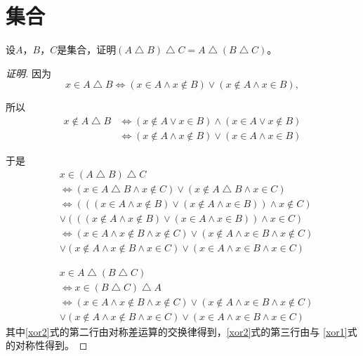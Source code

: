 \chapter{集合}
\begin{Ex}
设$A$，$B$，$C$是集合，证明$(A\bigtriangleup B)\bigtriangleup C =
A\bigtriangleup (B\bigtriangleup C)$。
\end{Ex}
\begin{proof}[证明]
  
  因为
  \begin{equation}
  x \in A \bigtriangleup B \Leftrightarrow
  (x \in A \land x \notin B) \lor (x \notin A \land x
  \in B),    
  \end{equation}

  所以
  \begin{equation}
    \begin{split}
      x \notin A \bigtriangleup B &\Leftrightarrow
  (x \notin A \lor x \in B) \land (x \in A \lor x
  \notin B)\\
  &\Leftrightarrow (x \notin A \land x \notin B) \lor (x \in A \land x \in B )
    \end{split}
  \end{equation}

  于是
  \begin{equation}\label{xor1}
    \begin{split}
      &x \in (A \bigtriangleup B) \bigtriangleup C\\
      &\Leftrightarrow (x \in A \bigtriangleup B \land x \notin C) \lor (x \notin A \bigtriangleup B \land x \in C)\\
      &\Leftrightarrow (((x \in A \land x \notin B) \lor (x \notin A \land x \in B)) \land x \notin C)\\
      &\lor (((x \notin A \land x \notin B) \lor (x \in A \land x \in B )) \land x \in C)\\
      &\Leftrightarrow (x \in A \land x \notin B \land x \notin C) \lor (x \notin A \land x \in B \land x \notin C)\\
      &\lor (x \notin A \land x \notin B \land x \in C) \lor (x \in A \land x \in B \land x \in C)
    \end{split}
  \end{equation}

  \begin{equation}\label{xor2}
    \begin{split}
      &x \in A \bigtriangleup (B \bigtriangleup C)\\
      &\Leftrightarrow x \in (B \bigtriangleup C) \bigtriangleup A\\
      &\Leftrightarrow (x \in A \land x \notin B \land x \notin C) \lor (x \notin A \land x \in B \land x \notin C)\\
      &\lor (x \notin A \land x \notin B \land x \in C) \lor (x \in A \land x \in B \land x \in C)
    \end{split}
  \end{equation}
  其中\eqref{xor2}式的第二行由对称差运算的交换律得到，\eqref{xor2}式的第三行由与
   \eqref{xor1}式的对称性得到。


\end{proof}
